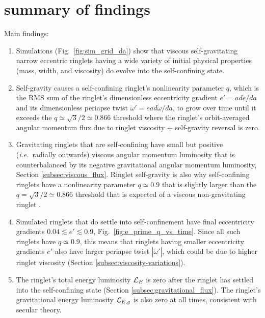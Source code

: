 \documentclass[preprint]{aastex62}
\begin{document}
\section{summary of findings}
\label{sec:summary}

Main findings:

\begin{enumerate}

\item Simulations (Fig.\ \ref{fig:sim_grid_da}) show that viscous self-gravitating
narrow eccentric ringlets having a wide variety of initial 
physical properties (mass, width, and viscosity) do evolve
into the self-confining state.

\item Self-gravity causes a self-confining ringlet's nonlinearity parameter $q$, 
which is the RMS sum of the ringlet's dimensionless eccentricity gradient $e'=ade/da$ 
and its dimensionless periapse twist $\tilde{\omega}' = ead\tilde{\omega}/da$,
to grow over time until it exceeds the $q\simeq\sqrt{3}/2\simeq0.866$ threshold where 
the ringlet's orbit-averaged angular momentum flux due to ringlet viscosity + self-gravity reversal is zero.

\item Gravitating ringlets that are self-confining have small but positive 
({\it i.e.}\ radially outwards) viscous angular momentum luminosity
that is counterbalanced by its negative gravitational angular momentum luminosity,
Section \ref{subsec:viscous_flux}. Ringlet self-gravity is also
why self-confining ringlets have a nonlinearity parameter $q\simeq0.9$
that is slightly larger than the $q = \sqrt{3}/2 \simeq 0.866$
threshold that is expected of a viscous non-gravitating ringlet
\citep{BGT82}.

\item Simulated ringlets that do settle into self-confinement have final eccentricity
gradients $0.04\lesssim e' \lesssim 0.9$, Fig.\ \ref{fig:e_prime_q_vs_time}. Since all such ringlets 
have $q\simeq0.9$, this means that ringlets having smaller eccentricity gradients $e'$
also have larger periapse twist $|\tilde{\omega}'|$, which could be due to higher 
ringlet viscosity (Section \ref{subsec:viscosity-variations}).

\item The ringlet's total energy luminosity ${\cal L}_{E}$ is zero after the ringlet has settled into
the self-confining state (Section \ref{subsec:gravitational_flux}). 
The ringlet's gravitational energy luminosity ${\cal L}_{E,g}$ is also
zero at all times, consistent with secular theory. 


\end{enumerate}
\end{document}
